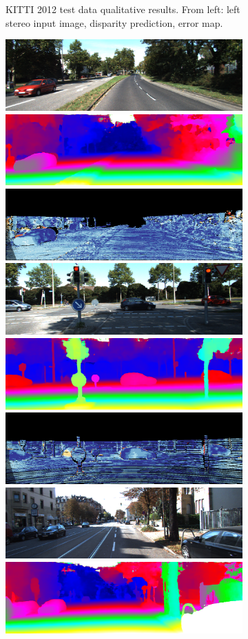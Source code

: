 \begin{figure}[p]
\begin{center}
\begin{subfigure}[t]{\linewidth}
	        \caption{KITTI 2012 test data qualitative results. From left: left stereo input image, disparity prediction, error map.}
            \vspace{2 mm}
		\end{subfigure}
    		\begin{subfigure}[t]{\linewidth}
            \centering
			\includegraphics[width=0.31\linewidth]{results_kitti_2015/000013_10.png}
			\includegraphics[width=0.31\linewidth]{results_kitti_2015/000013_10_disp.png}
			\includegraphics[width=0.31\linewidth]{results_kitti_2015/000013_10_error.png}
            \vspace{1 mm}
			\includegraphics[width=0.31\linewidth]{results_kitti_2015/000009_10.png}
			\includegraphics[width=0.31\linewidth]{results_kitti_2015/000009_10_disp.png}
			\includegraphics[width=0.31\linewidth]{results_kitti_2015/000009_10_error.png}
            \vspace{1 mm}
			\includegraphics[width=0.31\linewidth]{results_kitti_2015/000004_10.png}
			\includegraphics[width=0.31\linewidth]{results_kitti_2015/000004_10_disp.png}

\end{subfigure}
\end{center}
\end{figure}
